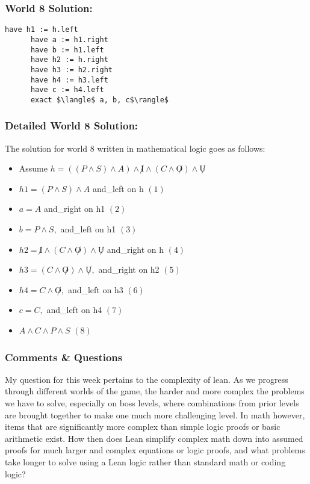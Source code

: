 \documentclass{article}
\theoremstyle{theorem}
\theoremstyle{definition}
\theoremstyle{remark}
\begin{document}
    \subsubsection*{World 8 Solution:}
    \begin{lstlisting}[mathescape=true]
      have h1 := h.left
      have a := h1.right
      have b := h1.left
      have h2 := h.right
      have h3 := h2.right
      have h4 := h3.left
      have c := h4.left
      exact $\langle$ a, b, c$\rangle$
    \end{lstlisting}

    \subsubsection*{Detailed World 8 Solution:}
      The solution for world 8 written in mathematical logic goes as follows: 
      \begin{itemize}
        \item Assume $h=((P \wedge S) \wedge A) \wedge \not I \wedge (C \wedge \not O) \wedge \not U$
        \item $h1 = (P \wedge S) \wedge A$ and\_left on h $(1)$
        \item $a = A$ and\_right on h1 $(2)$
        \item $b = P \wedge S, $ and\_left on h1 $(3)$ 
        \item $h2 = \not I \wedge (C \wedge \not O) \wedge \not U$ and\_right on h $(4)$
        \item $h3 = (C \wedge \not O) \wedge \not U, $ and\_right on h2 $(5)$
        \item $h4 = C \wedge \not O, $ and\_left on h3 $(6)$
        \item $c = C, $ and\_left on h4 $(7)$
        \item $A \wedge C \wedge P \wedge S$ $(8)$
      \end{itemize}

  \subsubsection{Comments \& Questions}
  My question for this week pertains to the complexity of lean. As we progress through different worlds of the game, the harder and more complex the problems we have to solve, especially on boss levels, where combinations from prior levels are brought together to make one much more challenging level. In math however, items that are significantly more complex than simple logic proofs or basic arithmetic exist. How then does Lean simplify complex math down into assumed proofs for much larger and complex equations or logic proofs, and what problems take longer to solve using a Lean logic rather than standard math or coding logic?
\end{document}
